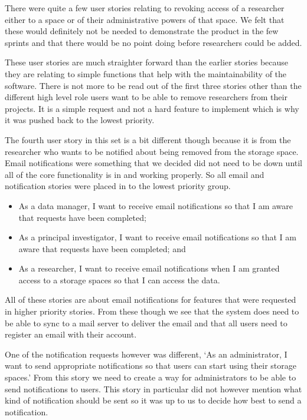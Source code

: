 \documentclass[a4paper,titlepage,12pt]{article}
\begin{document}
There were quite a few user stories relating to revoking access of a researcher
either to a space or of their administrative powers of that space. We felt that
these would definitely not be needed to demonstrate the product in the few
sprints and that there would be no point doing before researchers could be
added.

These user stories are much straighter forward than the earlier stories because
they are relating to simple functions that help with the maintainability of the
software. There is not more to be read out of the first three stories other
than the different high level role users want to be able to remove researchers
from their projects. It is a simple request and not a hard feature to implement
which is why it was pushed back to the lowest priority.

The fourth user story in this set is a bit different though because it is from
the researcher who wants to be notified about being removed from the storage
space. Email notifications were something that we decided did not need to be
down until all of the core functionality is in and working properly. So all
email and notification stories were placed in to the lowest priority group.

\begin{itemize}
	\item As a data manager, I want to receive email notifications so that
	      I am aware that requests have been completed;
	\item As a principal investigator, I want to receive email
	      notifications so that I am aware that requests have been
	      completed; and
	\item As a researcher, I want to receive email notifications when I am
	      granted access to a storage spaces so that I can access the data.
\end{itemize}

All of these stories are about email notifications for features that were
requested in higher priority stories. From these though we see that the system
does need to be able to sync to a mail server to deliver the email and that all
users need to register an email with their account.

One of the notification requests however was different, `As an administrator, I
want to send appropriate notifications so that users can start using their
storage spaces.' From this story we need to create a way for administrators to
be able to send notifications to users. This story in particular did not
however mention what kind of notification should be sent so it was up to us to
decide how best to send a notification.
\end{document}
